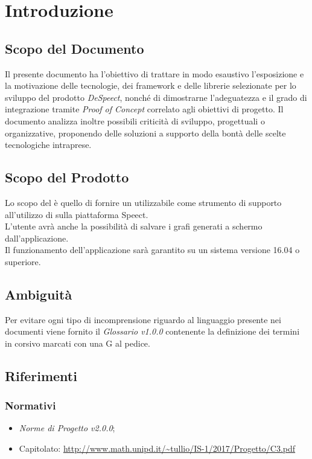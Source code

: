 \chapter{Introduzione}
\section{Scopo del Documento}
Il presente documento ha l'obiettivo di trattare in modo esaustivo l’esposizione e la motivazione delle tecnologie, dei framework e delle librerie selezionate per lo sviluppo del prodotto \textit{DeSpeect}, nonché di dimostrarne l'adeguatezza e il grado di integrazione tramite \textit{Proof of Concept} correlato agli obiettivi di progetto. Il documento analizza inoltre possibili criticità di sviluppo, progettuali o organizzative, proponendo delle soluzioni a supporto della bontà delle scelte tecnologiche intraprese. 

\section{Scopo del Prodotto}

Lo scopo del  è quello di fornire un  utilizzabile come strumento di supporto all'utilizzo di  sulla piattaforma Speect. 
\\ \noindent L'utente avrà anche la possibilità di salvare i grafi generati a schermo dall'applicazione.
\\ \noindent Il funzionamento dell'applicazione sarà garantito su un sistema  versione 16.04 o superiore.

\section{Ambiguità}
Per evitare ogni tipo di incomprensione riguardo al linguaggio presente nei documenti viene fornito il \textit{Glossario v1.0.0} contenente la definizione dei termini in corsivo marcati con una G al pedice.

\section{Riferimenti}
\subsection*{Normativi}
\begin{itemize}
	\item \textit{Norme di Progetto v2.0.0};
	\item Capitolato: \url{http://www.math.unipd.it/~tullio/IS-1/2017/Progetto/C3.pdf}
\end{itemize}
